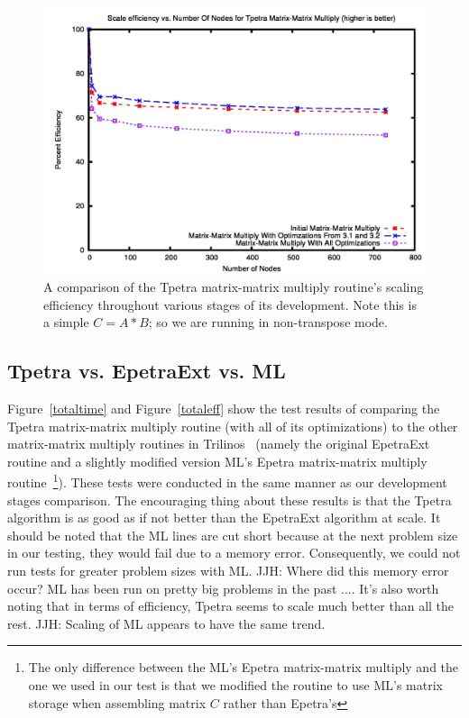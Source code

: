 \documentclass{article}
\newcommand{\JJH}[1]{\textcolor{jhuGreen}{JJH: #1}}
\begin{document}
\begin{figure}
\includegraphics[scale=.4]{tpetraeff.jpg}
\caption[Efficiency Comparison]{A comparison of the Tpetra matrix-matrix multiply routine's scaling efficiency
throughout various stages of its development. Note this is a simple $C=A*B$; so we are running in non-transpose mode.}
\label{tpetracompeff}
\end{figure}


\subsection{Tpetra vs. EpetraExt vs. ML}
Figure~\ref{totaltime} and Figure~\ref{totaleff} show the test results of comparing the Tpetra matrix-matrix multiply routine 
(with all of its optimizations) to the other matrix-matrix multiply routines in Trilinos~\cite{1089021} (namely the original EpetraExt 
routine and a slightly modified version ML's Epetra matrix-matrix multiply routine~\footnote{The only difference between the ML's Epetra matrix-matrix
multiply and the one we used in our test is that we modified the routine to use ML's matrix storage when assembling matrix $C$ rather than Epetra's}). 
These tests were conducted in the same manner as our development stages comparison. 
The encouraging thing about these results is that the Tpetra algorithm is as good as if not better than the EpetraExt 
algorithm at scale. It should be noted that the ML lines are cut short because at the next problem size in our testing, 
they would fail due to a memory error. Consequently, we could not run tests for greater problem sizes with ML. 
\JJH{Where did this memory error occur?  ML has been run on pretty big problems in the past ....}
It's also worth noting that in terms of efficiency, Tpetra seems to scale much better than all the rest.
\JJH{Scaling of ML appears to have the same trend.}
\end{document}
